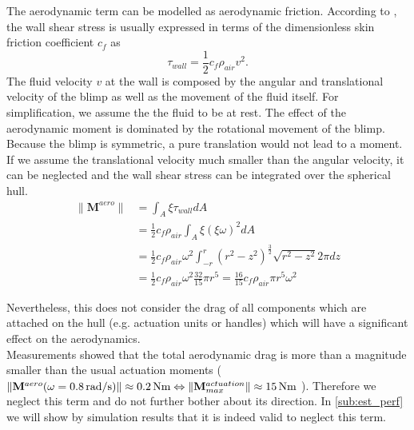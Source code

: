 The aerodynamic term can be modelled as aerodynamic friction.
According to \citet{Kundu2012}, the wall shear stress is usually expressed in terms of the dimensionless skin friction coefficient $c_f$ as 
\begin{equation}
\tau_{wall} = 
\frac{1}{2} c_f \rho_{air} v^2 .
\end{equation}
The fluid velocity $v$ at the wall is composed by the angular and translational velocity of the blimp as well as the movement of the fluid itself.
For simplification, we assume the the fluid to be at rest.
The effect of the aerodynamic moment is dominated by the rotational movement of the blimp.
Because the blimp is symmetric, a pure translation would not lead to a moment.
If we assume the translational velocity much smaller than the angular velocity, it can be neglected and the wall shear stress can be integrated over the spherical hull. 
\begin{equation}
\begin{aligned}
\| \mathbf{M}^{aero} \|
&= \int_A \xi \tau_{wall} dA \\
&= \frac{1}{2} c_f \rho_{air} \int_A \xi (\xi \omega)^2 dA \\
&= \frac{1}{2} c_f \rho_{air} \omega^2 \int_{-r}^{r} (r^2-z^2)^{\frac{3}{2}} \sqrt{r^2-z^2} 2\pi dz \\
&= \frac{1}{2} c_f \rho_{air} \omega^2 \frac{32}{15} \pi r^5
 = \frac{16}{15} c_f \rho_{air} \pi r^5 \omega^2
\end{aligned}
\end{equation}

Nevertheless, this does not consider the drag of all components which are attached on the hull (e.g. actuation units or handles) which will have a significant effect on the aerodynamics.
\\

Measurements showed that the total aerodynamic drag is more than a magnitude smaller than the usual actuation moments (
$\|\mathbf{M}^{aero}(\omega = \unit[0.8]{rad/s})\| \approx \unit[0.2]{Nm} \Leftrightarrow 
\| \mathbf{M}^{actuation}_{max} \| \approx \unit[15]{Nm}$
). 
Therefore we neglect this term and do not further bother about its direction.
In \cref{sub:est_perf} we will show by simulation results that it is indeed valid to neglect this term.

